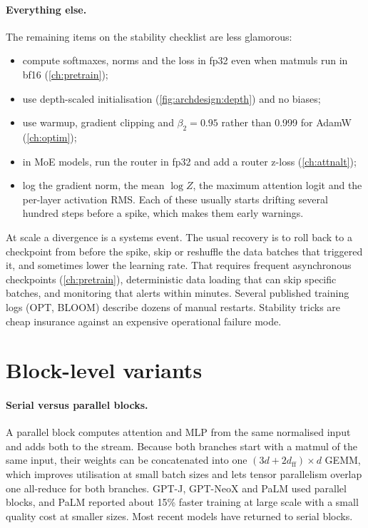 \paragraph{Everything else.} The remaining items on the stability checklist are less glamorous:
\begin{itemize}
\item compute softmaxes, norms and the loss in fp32 even when matmuls run in bf16 (\cref{ch:pretrain});
\item use depth-scaled initialisation (\cref{fig:archdesign:depth}) and no biases;
\item use warmup, gradient clipping and $\beta_2=0.95$ rather than 0.999 for AdamW (\cref{ch:optim});
\item in MoE models, run the router in fp32 and add a router z-loss (\cref{ch:attnalt});
\item log the gradient norm, the mean $\log Z$, the maximum attention logit and the per-layer activation
  RMS. Each of these usually starts drifting several hundred steps before a spike, which makes them
  early warnings.
\end{itemize}

\begin{systemslens}
At scale a divergence is a systems event. The usual recovery is to roll back to a checkpoint from before
the spike, skip or reshuffle the data batches that triggered it, and sometimes lower the learning rate.
That requires frequent asynchronous checkpoints (\cref{ch:pretrain}), deterministic data loading that can
skip specific batches, and monitoring that alerts within minutes. Several published training logs (OPT,
BLOOM) describe dozens of manual restarts. Stability tricks are cheap insurance against an expensive
operational failure mode.
\end{systemslens}

\section{Block-level variants}\label{sec:archdesign:block}

\paragraph{Serial versus parallel blocks.} A parallel block computes attention and MLP from the same
normalised input and adds both to the stream. Because both branches start with a matmul of the same
input, their weights can be concatenated into one $(3d + 2d_\text{ff})\times d$ GEMM, which improves
utilisation at small batch sizes and lets tensor parallelism overlap one all-reduce for both branches.
GPT-J, GPT-NeoX and PaLM used parallel blocks, and PaLM reported about 15\% faster training at large
scale with a small quality cost at smaller sizes. Most recent models have returned to serial blocks.

